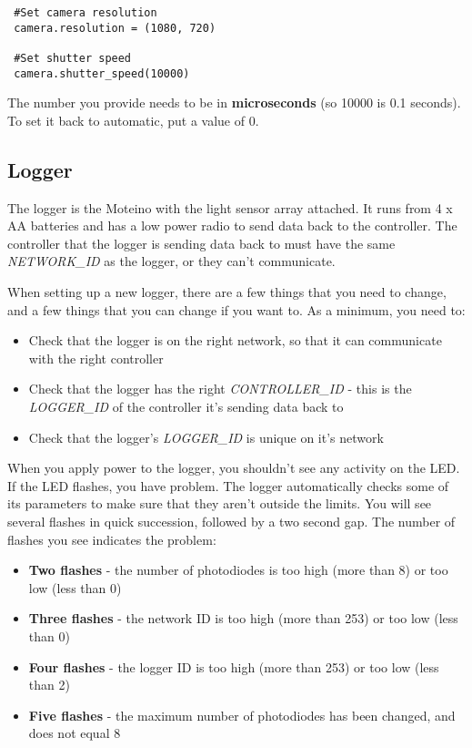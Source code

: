 \documentclass[10pt]{article}
\begin{document}
\begin{verbatim}
 #Set camera resolution
 camera.resolution = (1080, 720)
 
 #Set shutter speed
 camera.shutter_speed(10000)
\end{verbatim}

The number you provide needs to be in \textbf{microseconds} (so 10000 is 0.1 seconds). To set it back to automatic, put a value of 0.

\subsection{Logger}
The logger is the Moteino with the light sensor array attached. It runs from 4 x AA batteries and has a low power radio to send data back to the controller. The controller
that the logger is sending data back to must have the same \textit{NETWORK\_ID} as the logger, or they can't communicate.

When setting up a new logger, there are a few things that you need to change, and a few things that you can change if you want to. As a minimum, you need to:

\begin{itemize}
 \item Check that the logger is on the right network, so that it can communicate with the right controller
 \item Check that the logger has the right \textit{CONTROLLER\_ID} - this is the \textit{LOGGER\_ID} of the controller it's sending data back to
 \item Check that the logger's \textit{LOGGER\_ID} is unique on it's network
\end{itemize}

When you apply power to the logger, you shouldn't see any activity on the LED. If the LED flashes, you have problem. The logger automatically checks some of its parameters to make sure that they aren't outside the limits. You will see several flashes in quick succession, followed by a two second gap. The number of flashes you see indicates the problem:

\begin{itemize}
 \item \textbf{Two flashes}	- the number of photodiodes is too high (more than 8) or too low (less than 0)
 \item \textbf{Three flashes}	- the network ID is too high (more than 253) or too low (less than 0)
 \item \textbf{Four flashes}	- the logger ID is too high (more than 253) or too low (less than 2)
 \item \textbf{Five flashes}	- the maximum number of photodiodes has been changed, and does not equal 8
\end{itemize}
   
\end{document}
